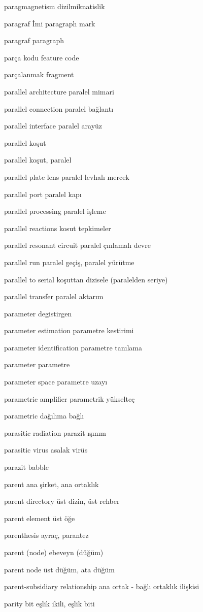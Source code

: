\documentclass[12pt,fleqn]{article}\usepackage{../../common}
\begin{document}
paragmagnetism dizilmiknatislik

paragraf İmi paragraph mark

paragraf paragraph

parça kodu feature code

parçalanmak fragment

parallel architecture paralel mimari

parallel connection paralel bağlantı

parallel interface paralel arayüz

parallel koşut

parallel koşut, paralel

parallel plate lens paralel levhalı mercek

parallel port paralel kapı

parallel processing paralel işleme

parallel reactions kosut tepkimeler

parallel resonant circuit paralel çınlamalı devre

parallel run paralel geçiş, paralel yürütme

parallel to serial koşuttan dizisele (paralelden seriye)

parallel transfer paralel aktarım

parameter degistirgen

parameter estimation parametre kestirimi

parameter identification parametre tanılama

parameter parametre

parameter space parametre uzayı

parametric amplifier parametrik yükselteç

parametric dağılıma bağlı

parasitic radiation parazit ışınım

parasitic virus asalak virüs

parazit babble

parent ana şirket, ana ortaklık

parent directory üst dizin, üst rehber

parent element üst öğe

parenthesis ayraç, parantez

parent (node) ebeveyn (düğüm)

parent node üst düğüm, ata düğüm

parent-subsidiary relationship ana ortak - bağlı ortaklık ilişkisi

parity bit eşlik ikili, eşlik biti
\end{document}
